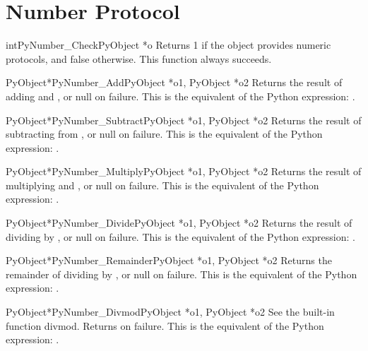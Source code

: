 \section{Number Protocol}

     \begin{cfuncdesc}{int}{PyNumber_Check}{PyObject *o}
         Returns 1 if the object  provides numeric protocols, and
	 false otherwise. 
	 This function always succeeds.
     \end{cfuncdesc}


     \begin{cfuncdesc}{PyObject*}{PyNumber_Add}{PyObject *o1, PyObject *o2}
	 Returns the result of adding  and , or null on failure.
	 This is the equivalent of the Python expression: .
     \end{cfuncdesc}


     \begin{cfuncdesc}{PyObject*}{PyNumber_Subtract}{PyObject *o1, PyObject *o2}
	 Returns the result of subtracting  from , or null on
	 failure.  This is the equivalent of the Python expression:
	 .
     \end{cfuncdesc}


     \begin{cfuncdesc}{PyObject*}{PyNumber_Multiply}{PyObject *o1, PyObject *o2}
	 Returns the result of multiplying  and , or null on
	 failure.  This is the equivalent of the Python expression:
	 .
     \end{cfuncdesc}


     \begin{cfuncdesc}{PyObject*}{PyNumber_Divide}{PyObject *o1, PyObject *o2}
	 Returns the result of dividing  by , or null on failure.
	 This is the equivalent of the Python expression: .
     \end{cfuncdesc}


     \begin{cfuncdesc}{PyObject*}{PyNumber_Remainder}{PyObject *o1, PyObject *o2}
	 Returns the remainder of dividing  by , or null on
	 failure.  This is the equivalent of the Python expression:
	 .
     \end{cfuncdesc}


     \begin{cfuncdesc}{PyObject*}{PyNumber_Divmod}{PyObject *o1, PyObject *o2}
	 See the built-in function divmod.  Returns {\NULL} on failure.
	 This is the equivalent of the Python expression:
	 .
     \end{cfuncdesc}


